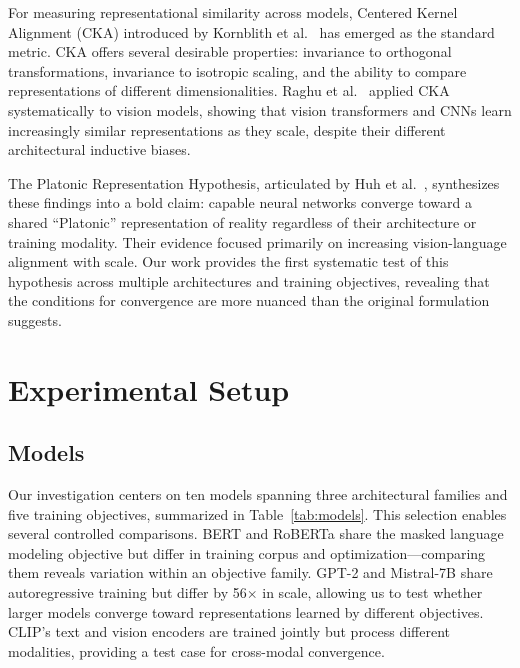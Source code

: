 \documentclass{article}
\begin{document}
For measuring representational similarity across models, Centered Kernel Alignment (CKA) introduced by Kornblith et al.~\cite{kornblith2019similarity} has emerged as the standard metric. CKA offers several desirable properties: invariance to orthogonal transformations, invariance to isotropic scaling, and the ability to compare representations of different dimensionalities. Raghu et al.~\cite{raghu2021vision} applied CKA systematically to vision models, showing that vision transformers and CNNs learn increasingly similar representations as they scale, despite their different architectural inductive biases.

The Platonic Representation Hypothesis, articulated by Huh et al.~\cite{huh2024platonic}, synthesizes these findings into a bold claim: capable neural networks converge toward a shared ``Platonic'' representation of reality regardless of their architecture or training modality. Their evidence focused primarily on increasing vision-language alignment with scale. Our work provides the first systematic test of this hypothesis across multiple architectures and training objectives, revealing that the conditions for convergence are more nuanced than the original formulation suggests.

\section{Experimental Setup}

\subsection{Models}

Our investigation centers on ten models spanning three architectural families and five training objectives, summarized in Table~\ref{tab:models}. This selection enables several controlled comparisons. BERT and RoBERTa share the masked language modeling objective but differ in training corpus and optimization---comparing them reveals variation within an objective family. GPT-2 and Mistral-7B share autoregressive training but differ by 56$\times$ in scale, allowing us to test whether larger models converge toward representations learned by different objectives. CLIP's text and vision encoders are trained jointly but process different modalities, providing a test case for cross-modal convergence.
\end{document}
